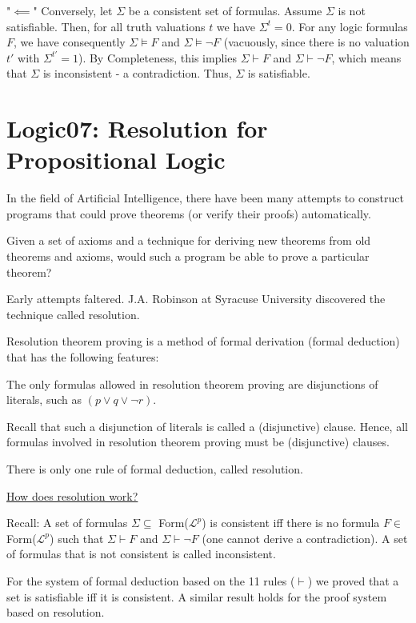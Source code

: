 \documentclass{article}
\begin{document}
"$\impliedby$" Conversely, let $\Sigma$ be a consistent set of formulas. Assume $\Sigma$ is not satisfiable. Then, for all truth valuations $t$ we have $\Sigma^t = 0$. For any logic formulas $F$, we have consequently $\Sigma \vDash F$ and $\Sigma \vDash \neg F$ (vacuously, since there is no valuation $t'$ with $\Sigma^{t'} = 1$). By Completeness, this implies $\Sigma \vdash F$ and $\Sigma \vdash \neg F$, which means that $\Sigma$ is inconsistent - a contradiction. Thus, $\Sigma$ is satisfiable.

\section{Logic07: Resolution for Propositional Logic}

In the field of Artificial Intelligence, there have been many attempts to construct programs that could prove theorems (or verify their proofs) automatically. 

Given a set of axioms and a technique for deriving new theorems from old theorems and axioms, would such a program be able to prove a particular theorem?

Early attempts faltered. J.A. Robinson at Syracuse University discovered the technique called resolution. 


Resolution theorem proving is a method of formal derivation (formal deduction) that has the following features:

The only formulas allowed in resolution theorem proving are disjunctions of literals, such as $(p \vee q \vee \neg r)$. 

Recall that such a disjunction of literals is called a (disjunctive) clause. Hence, all formulas involved in resolution theorem proving must be (disjunctive) clauses. 

There is only one rule of formal deduction, called resolution. 

\underline{How does resolution work?}

Recall: A set of formulas $\Sigma \subseteq$ Form($\mathcal{L}^p$) is consistent iff there is no formula $F \in $ Form($\mathcal{L}^p$) such that $\Sigma \vdash F$ and $\Sigma \vdash \neg F$ (one cannot derive a contradiction). A set of formulas that is not consistent is called inconsistent. 

For the system of formal deduction based on the 11 rules ($\vdash$) we proved that a set is satisfiable iff it is consistent. A similar result holds for the proof system based on resolution. 
\end{document}
